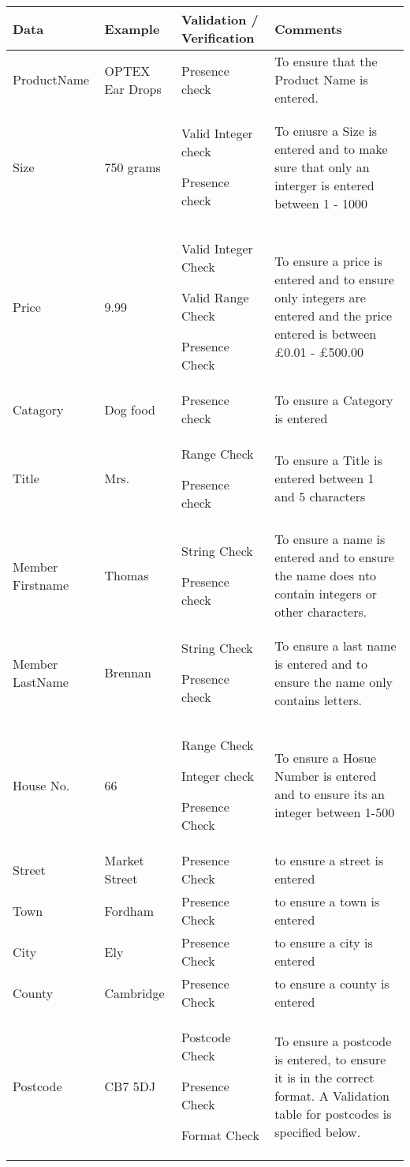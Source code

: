 \begin{python}
\begin{tabular}{|p{2cm}|p{2cm}|p{3.5cm}|p{4cm}|}
        \hline
        \textbf{Data} & \textbf{Example} & \textbf{Validation / Verification} & \textbf{Comments} \\ \hline
	ProductName &  OPTEX Ear Drops & Presence check & To ensure that the Product Name is entered.\\ \hline
	Size & 750 grams & Valid Integer check \par Presence check & To enusre a Size is entered and to make sure that only an interger is entered between 1 - 1000 \\ \hline
          Price & 9.99 & Valid Integer Check \par Valid Range Check \par Presence Check & To ensure a price is entered and to ensure only integers are entered and the price entered is between £0.01 - £500.00\\ \hline
          Catagory &  Dog food &  Presence check &  To ensure a Category is entered \\ \hline
	Title &  Mrs. & Range Check \par Presence check & To ensure a Title is entered between 1 and 5 characters \\ \hline
          Member Firstname & Thomas & String Check \par Presence check & To ensure a name is entered and to ensure the name does nto contain integers or other characters.\\ \hline
          Member LastName & Brennan & String Check \par Presence check & To ensure a last name is entered and to ensure the name only contains letters.\\ \hline
          House No. &  66 & Range Check \par Integer check \par Presence Check & To ensure a Hosue Number is entered and to ensure its an integer between 1-500\\ \hline
	Street &  Market Street & Presence Check & to ensure a street is entered\\ \hline
	Town &  Fordham & Presence Check & to ensure a town is entered\\ \hline
         City &  Ely & Presence Check & to ensure a city is entered\\ \hline
         County & Cambridge & Presence Check & to ensure a county is entered\\ \hline
         Postcode & CB7 5DJ & Postcode Check \par Presence Check \par Format Check & To ensure a postcode is entered, to ensure it is in the correct format. A Validation table for postcodes is specified below. \\ \hline
\end{tabular}


\end{python}
